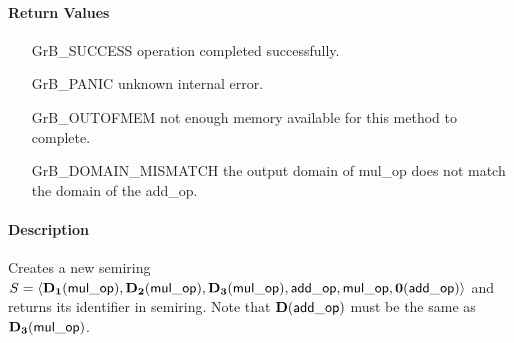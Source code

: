 \paragraph{Return Values}

\begin{itemize}[leftmargin=2.1in]
\item[{\sf GrB\_SUCCESS}]           operation completed successfully.
\item[{\sf GrB\_PANIC}]             unknown internal error.
\item[{\sf GrB\_OUTOFMEM}]          not enough memory available for this method to complete.
\item[{\sf GrB\_DOMAIN\_MISMATCH}]  the output domain of {\sf mul\_op} does not match the
                                    domain of the {\sf add\_op}.
\end{itemize}

\paragraph{Description}

Creates a new semiring $S = \langle \bold{D_1}({\sf mul\_op}), \bold{D_2}({\sf mul\_op}), 
\bold{D_3}({\sf mul\_op}), {\sf add\_op}, {\sf mul\_op}, \bold{0}({\sf add\_op})\rangle$ and 
returns its identifier in {\sf semiring}.  Note that $\bold{D}({\sf add\_op})$ must be
the same as $\bold{D_3}({\sf mul\_op})$.

